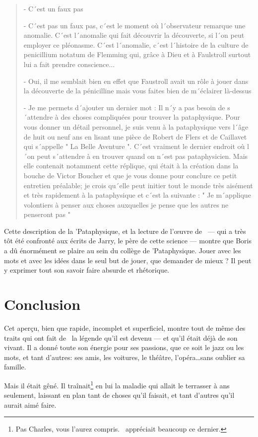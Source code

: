 {\begin{quotation}
- C´est un faux pas

- C´est pas un faux pas, c´est le moment où l´observateur remarque une anomalie. C´est l´anomalie qui fait découvrir la découverte, si l´on peut employer ce pléonasme. C´est l´anomalie, c´est l´histoire de la culture de penicillium notatum de Flemming qui, grâce à Dieu et à Faulstroll surtout lui a fait prendre conscience...

- Oui, il me semblait bien en effet que Faustroll avait un rôle à jouer dans la découverte de la pénicilline mais vous faites bien de m´éclairer là-dessus

- Je me permets d´ajouter un dernier mot : Il n´y a pas besoin de s´attendre à des choses compliquées pour trouver la pataphysique. Pour vous donner un détail personnel, je suis venu à la pataphysique vers l´âge de huit ou neuf ans en lisant une pièce de Robert de Flers et de Caillavet qui s´appelle " La Belle Aventure ". C´est vraiment le dernier endroit où l´on peut s´attendre à en trouver quand on n´est pas pataphysicien. Mais elle contenait notamment cette réplique, qui était à la création dans la bouche de Victor Boucher et que je vous donne pour conclure ce petit entretien préalable; je crois qu´elle peut initier tout le monde très aisément et très rapidement à la pataphysique et c´est la suivante : " Je m´applique volontiers à penser aux choses auxquelles je pense que les autres ne penseront pas "

\end{quotation}
} 

Cette description de la 'Pataphysique, et la lecture de l'\oe{}uvre de \BV\ --- qui a très tôt été
confronté aux écrits de Jarry, le père de cette science --- montre que Boris a dû énormément
se plaire au sein du collège de 'Pataphysique. Jouer avec les mots et avec les
idées dans le seul but de jouer, que demander de mieux ? Il peut y exprimer tout
son savoir faire absurde et rhétorique.


\section*{Conclusion}

Cet aperçu, bien que rapide, incomplet et superficiel, montre tout de même des traits qui ont fait de \BV\ la
légende qu'il est devenu --- et qu'il était déjà de son vivant. Il a donné toute son énergie pour ses passions,
que ce soit le jazz ou les mots, et tant d'autres: ses amis, les voitures, le théâtre, l'opéra\ldots sans
oublier sa famille.

Mais il était gêné. Il traînait\footnote{Pas Charles, vous l'aurez compris. \BV\ appréciait beaucoup ce dernier.}
en lui la maladie qui allait le terrasser à  ans seulement, laissant en plan tant de choses qu'il faisait,
et tant d'autres qu'il aurait aimé faire.

